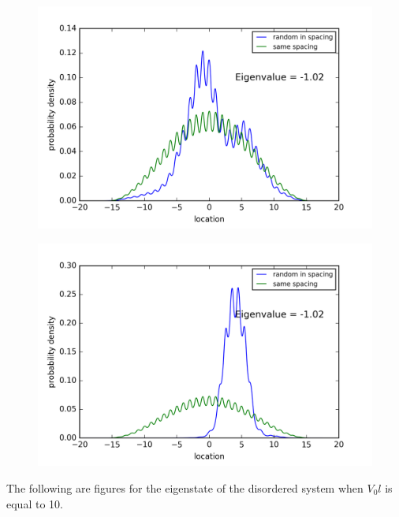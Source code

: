 \begin{figure}[!htbh]
\centering
\begin{minipage}{.45\textwidth}
  \centering
  \includegraphics[width=1.1\linewidth]{Graphics/1_0_1th_Lowest_Rand1_1.png}
  \label{fig:Area1_1thlowestRand1.1}
\end{minipage}\qquad
\begin{minipage}{.45\textwidth}
  \centering
  \includegraphics[width=1.1\linewidth]{Graphics/1_0_1th_Lowest_Rand1_5.png}
  \label{fig:Area1_1thlowestRand1.5}
\end{minipage}
\end{figure}

\newpage
The following are figures for the eigenstate of the disordered system when $V_0l$ is equal to 10.

